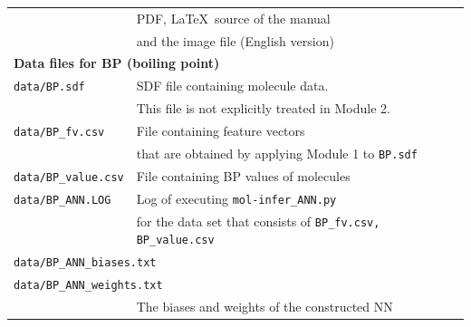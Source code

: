 \documentclass[11pt,titlepage,dvipdfmx,twoside]{book}
\begin{document}
\begin{table}[h!]
\begin{tabular}{lcll}
  &&\multicolumn{2}{l}{PDF, \LaTeX\   source of the manual}\\
  &&\multicolumn{2}{l}{and the image file (English version)}\\
  \hline
  \multicolumn{4}{l}{\bf Data files for BP (boiling point)~\cite{pubchem}}\\
  \multicolumn{2}{l}{\tt data/BP.sdf} & \multicolumn{2}{l}{SDF file containing molecule data.}\\
  \multicolumn{2}{l}{\tt } & \multicolumn{2}{l}{This file is not explicitly treated in Module 2.}\\
  \multicolumn{2}{l}{\tt data/BP\_fv.csv} & \multicolumn{2}{l}{File containing feature vectors}\\
  \multicolumn{2}{l}{\tt } & \multicolumn{2}{l}{that are obtained by applying Module 1 to {\tt BP.sdf}}\\
  \multicolumn{2}{l}{\tt data/BP\_value.csv} & \multicolumn{2}{l}{File containing BP values of molecules}\\
  \multicolumn{2}{l}{\tt data/BP\_ANN.LOG} & \multicolumn{2}{l}{Log of executing {\tt mol-infer\_ANN.py}}\\
  \multicolumn{2}{l}{\tt } & \multicolumn{2}{l}{for the data set that consists of {\tt BP\_fv.csv, BP\_value.csv}}\\
  \multicolumn{4}{l}{\tt data/BP\_ANN\_biases.txt} \\
  \multicolumn{4}{l}{\tt data/BP\_ANN\_weights.txt} \\
  &&\multicolumn{2}{l}{The biases and weights of the constructed NN}\\
  \hline
  \end{tabular}
\end{table}

\newpage
\end{document}
